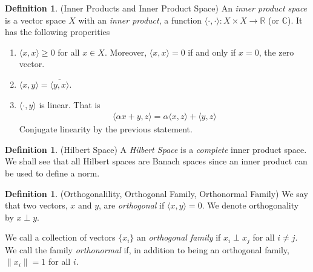 \documentclass[12pt]{article}
\theoremstyle{plain}
\theoremstyle{definition}
\newtheorem{defn}[thm]{Definition}
\theoremstyle{remark}
\begin{document}
\begin{defn}(Inner Products and Inner Product Space)
An \emph{inner product space} is a vector space $X$ with an
\emph{inner product}, a function $\langle\cdot,\cdot\rangle:X\times
X\rightarrow\mathbb{R}$ (or $\mathbb{C}$). It has the following
properities
\begin{enumerate}
  \item $\langle x,x\rangle \geq 0$ for all $x\in X$. Moreover,
    $\langle x,x\rangle=0$ if and only if $x=0$, the zero vector.
  \item $\langle x,y\rangle= \overline{\langle y,x\rangle}$.
  \item $\langle \cdot,y\rangle$ is linear. That is
    \begin{align*}
      \langle \alpha x + y,z\rangle =
      \alpha \langle x ,z\rangle + \langle y,z\rangle
    \end{align*}
    Conjugate linearity by the previous statement.
\end{enumerate}
\end{defn}

\begin{defn}(Hilbert Space)
A \emph{Hilbert Space} is a \emph{complete} inner product space. We
shall see that all Hilbert spaces are Banach spaces since an inner
product can be used to define a norm.
\end{defn}

\begin{defn}(Orthogonalility, Orthogonal Family, Orthonormal Family)
We say that two vectors, $x$ and $y$, are \emph{orthogonal} if
$\langle x,y\rangle =0$. We denote orthogonality by $x\perp y$.

We call a collection of vectors $\{x_i\}$ an \emph{orthogonal family} if
$x_i\perp x_j$ for all $i\neq j$. We call the family \emph{orthonormal}
if, in addition to being an orthogonal family, $\lVert x_i\rVert=1$ for
all $i$.
\end{defn}
\end{document}

